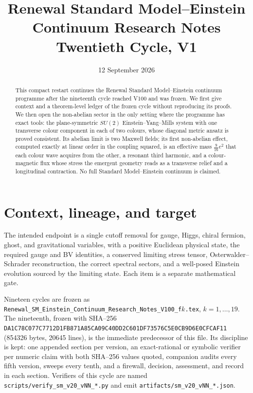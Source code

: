 \documentclass[11pt]{article}
\title{Renewal Standard Model--Einstein Continuum Research Notes\\
Twentieth Cycle, V1}
\author{}
\date{12 September 2026}
\theoremstyle{remark}
\begin{document}
\maketitle

\begin{abstract}
This compact restart continues the Renewal Standard Model--Einstein
continuum programme after the nineteenth cycle reached V100 and was
frozen.  We first give context and a theorem-level ledger of the frozen
cycle without reproducing its proofs.  We then open the non-abelian
sector in the only setting where the programme has exact tools: the
plane-symmetric \(SU(2)\) Einstein--Yang--Mills system with one
transverse colour component in each of two colours, whose diagonal
metric ansatz is proved consistent.  Its abelian limit is two Maxwell
fields; its first non-abelian effect, computed exactly at linear order
in the coupling squared, is an effective mass \(\tfrac9{16}e^2\) that
each colour wave acquires from the other, a resonant third harmonic,
and a colour-magnetic flux whose stress the emergent geometry reads as
a transverse relief and a longitudinal contraction.  No full Standard
Model--Einstein continuum is claimed.
\end{abstract}

\tableofcontents

\section{Context, lineage, and target}
\label{sec:v20v1}

The intended endpoint is a single cutoff removal for gauge, Higgs,
chiral fermion, ghost, and gravitational variables, with a positive
Euclidean physical state, the required gauge and BV identities, a
conserved limiting stress tensor, Osterwalder--Schrader reconstruction,
the correct spectral sectors, and a well-posed Einstein evolution
sourced by the limiting state.  Each item is a separate mathematical
gate.

Nineteen cycles are frozen as
\texttt{Renewal\_SM\_Einstein\_Continuum\_Research\_Notes\_V100\_f}\(k\)\texttt{.tex},
\(k=1,\dots,19\).  The nineteenth, frozen with SHA--256
\texttt{DA1C78C077C7712D1FB871A85CA09C40DD2C601DF73576C5E0CB9D6E0CFCAF11}
(854326 bytes, 20645 lines), is the immediate predecessor of this
file.  Its discipline is kept: one appended section per version, an
exact-rational or symbolic verifier per numeric claim with both
SHA--256 values quoted, companion audits every fifth version, sweeps
every tenth, and a firewall, decision, assessment, and record in each
section.  Verifiers of this cycle are named
\texttt{scripts/verify\_sm\_v20\_vNN\_*.py} and emit
\texttt{artifacts/sm\_v20\_vNN\_*.json}.
\end{document}
